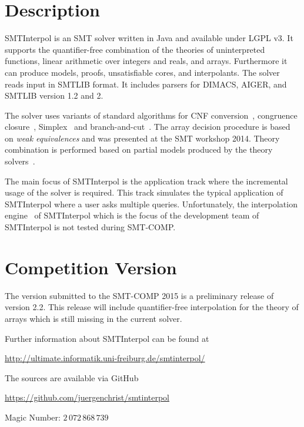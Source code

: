 \documentclass{article}
\title{\SI\\{\large Version \version}}
\author{J\"urgen Christ, Jochen Hoenicke\\
  University of Freiburg\\
  \texttt{\{christj,hoenicke\}@informatik.uni-freiburg.de}}
\date{\today}
\newcommand\SI{SMTInterpol\xspace}
\begin{document}
\maketitle
\section*{Description}
\SI is an SMT solver written in Java and available under LGPL v3.  It supports
the quantifier-free combination of the theories of uninterpreted functions,
linear arithmetic over integers and reals, and arrays.  Furthermore it can
produce models, proofs, unsatisfiable cores, and interpolants.  The solver
reads input in SMTLIB format.  It includes parsers for DIMACS, AIGER, and
SMTLIB version 1.2 and 2.

The solver uses variants of standard algorithms for CNF
conversion~\cite{DBLP:journals/jsc/PlaistedG86}, congruence
closure~\cite{DBLP:conf/rta/NieuwenhuisO05}, Simplex~\cite{DBLP:conf/cav/DutertreM06} and
branch-and-cut~\cite{DBLP:conf/cav/DilligDA09}.
The array decision procedure is based on \emph{weak equivalences} and was
presented at the SMT workshop 2014.
Theory combination is performed based on partial models produced by the theory
solvers~\cite{DBLP:journals/entcs/MouraB08}.

The main focus of \SI is the application track where the incremental usage of
the solver is required.  This track simulates the typical application of \SI
where a user asks multiple queries.  Unfortunately, the interpolation
engine~\cite{DBLP:conf/tacas/ChristHN13} of \SI which is the focus of the
development team of \SI is not tested during SMT-COMP.

\section*{Competition Version}
The version submitted to the SMT-COMP 2015 is a preliminary release of version
2.2.  This release will include quantifier-free interpolation for the theory
of arrays which is still missing in the current solver.

Further information about \SI can be found at
\begin{center}
  \url{http://ultimate.informatik.uni-freiburg.de/smtinterpol/}
\end{center}
The sources are available via GitHub
\begin{center}
  \url{https://github.com/juergenchrist/smtinterpol}
\end{center}

Magic Number: $2\,072\,868\,739$



\end{document}
